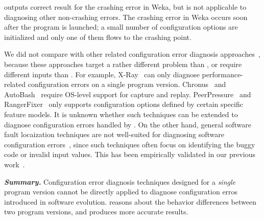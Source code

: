 \conftool outputs correct result for the crashing error in Weka,
but is not applicable to diagnosing other non-crashing errors.
The crashing error in Weka occurs soon after the program
is launched; a small number of configuration options
are initialized and only one of them flows to the crashing point.



We did not compare \ourtool with other related
configuration error diagnosis approaches~\cite{Attariyan:2010:ACT,
xray, Whitaker:2004:CDS, Su:2007:AIC, Wang:2004:AMT, rangefix},
because these approaches target a rather
different problem than \ourtool, or require different
inputs than \ourtool. For example, 
X-Ray~\cite{xray} can only diagnose
performance-related configuration errors on a single
program version. Chronus~\cite{Whitaker:2004:CDS}
and AutoBash~\cite{Su:2007:AIC}
require OS-level support for capture and replay.
PeerPressure~\cite{Wang:2004:AMT} and RangerFixer~\cite{rangefix} only
supports configuration options defined by certain
specific feature models. It is unknown whether
such techniques can be extended to diagnose configuration
errors handled by \ourtool. On the other
hand, general software fault locaization techniques
are not well-suited for diagnosing software
configuration errors~\cite{Jones:2002, McCamant:2003}, since such techniques
often focus on identifying the buggy code or
invalid input values. This has been empirically
validated in our previous work~\cite{Zhang:2013:ADS}.


\vspace{1mm}

\noindent \textbf{\textit{Summary.}} Configuration
error diagnosis techniques designed for a \textit{single}
program version cannot be directly applied to diagnose
configuration erros introduced in software evolution.
\ourtool reasons about the behavior differences between
two program versions, and produces more accurate results.


